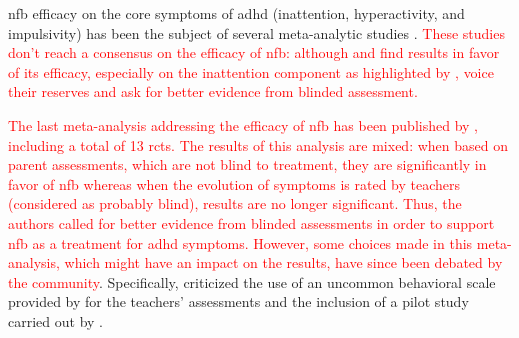 \gls{nfb} efficacy on the core symptoms of \gls{adhd} (inattention, hyperactivity, and impulsivity) has been the 
subject of several meta-analytic studies \citep{Loo2005, Lofthouse2012, Arns2009, Micoulaud2014, Sonuga-Barke2013}. 
\textcolor{red}{These studies don't reach a consensus on the efficacy of \gls{nfb}: although \citet{Arns2009} and \citet{Micoulaud2014} 
find results in favor of its efficacy, especially on the inattention component as highlighted by \citeauthor{Micoulaud2014}, \citet{Loo2005, 
Lofthouse2012, Sonuga-Barke2013} voice their reserves and ask for better evidence from blinded assessment.}

\textcolor{red}{The last meta-analysis addressing the efficacy of \gls{nfb} has been published by \citet{Cortese2016}, including a total of 13
\glspl{rct}. The results of this analysis are mixed: when based on parent assessments, which are not blind to treatment, they are significantly 
in favor of \gls{nfb} whereas when the evolution of symptoms is rated by teachers (considered as probably blind), results are no longer 
significant. Thus, the authors called for better evidence from blinded assessments in order to support \gls{nfb} as a treatment for \gls{adhd} symptoms.
However, some choices made in this meta-analysis, which might have an impact on the results, have since been debated by the community}. Specifically, 
\citet{Micoulaud2016} criticized the use of an uncommon behavioral scale provided by \citet{Steiner2014} for the teachers' assessments 
and the inclusion of a pilot study carried out by \citet{Arnold2014}. 

